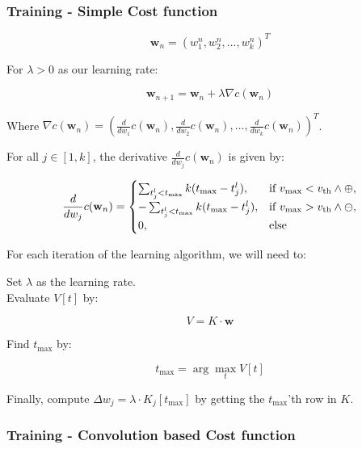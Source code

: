 \subsubsection{Training - Simple Cost function}

\begin{equation}
\mathbf{w}_n = (w_1^n, w_2^n, \ldots, w_k^n)^T
\end{equation}

For $\lambda > 0$ as our learning rate:

\begin{equation}
\mathbf{w}_{n+1} = \mathbf{w}_n + \lambda \nabla c(\mathbf{w}_n)
\end{equation}

Where $\nabla c(\mathbf{w}_n) = \left(\frac{d}{dw_1} c(\mathbf{w}_n), \frac{d}{dw_2} c(\mathbf{w}_n), \ldots, \frac{d}{dw_k} c(\mathbf{w}_n)\right)^T$.

For all $j \in [1, k]$, the derivative $\frac{d}{dw_j} c(\mathbf{w}_n)$ is given by:

\begin{equation}
    \frac{d}{dw_j} c(\mathbf{w}_n) = 
    \begin{cases}
    \sum_{t_j^l < t_{\text{max}}} k(t_{\text{max}} - t_j^l), & \text{if } v_{\text{max}} < v_{\text{th}} \land \oplus, \cr
    -\sum_{t_j^l < t_{\text{max}}} k(t_{\text{max}} - t_j^l), & \text{if } v_{\text{max}} > v_{\text{th}} \land \ominus, \cr
    0, & \text{else}
    \end{cases}
\end{equation}

For each iteration of the learning algorithm, we will need to:

Set $\lambda$ as the learning rate. \\
Evaluate $V[t]$ by: 

\begin{equation}
    V = K \cdot \mathbf{w}
\end{equation}

Find $t_{\text{max}}$ by: 

\begin{equation}
    t_{\text{max}} = \arg\max_t V[t]
\end{equation}

Finally, compute $\Delta w_j = \lambda \cdot K_j[t_{\text{max}}]$ by getting the $t_{\text{max}}$'th row in $K$.

\subsubsection{Training - Convolution based Cost function}

